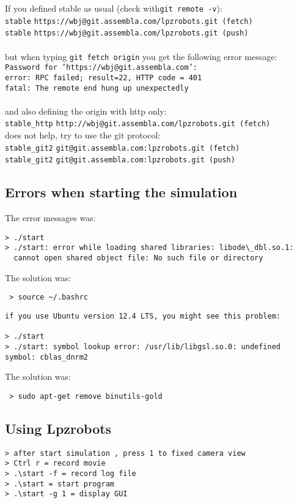 If you defined stable as usual (check with{\tt git remote -v}):\\
 \nolinkurl{stable}    \nolinkurl{https://wbj@git.assembla.com/lpzrobots.git (fetch)}\\
 \nolinkurl{stable}    \nolinkurl{https://wbj@git.assembla.com/lpzrobots.git (push)}\\\\
%
but when typing {\tt git fetch origin} you get the following error message: \\
{\tt Password for 'https://wbj@git.assembla.com':} \\
{\tt error: RPC failed; result=22, HTTP code = 401} \\
{\tt fatal: The remote end hung up unexpectedly} \\\\
%
and also defining the origin with http only:\\
\nolinkurl{stable_http}    \nolinkurl{http://wbj@git.assembla.com/lpzrobots.git (fetch)}\\
does not help, try to use the git protocol:\\
\nolinkurl{stable_git2}    \nolinkurl{git@git.assembla.com:lpzrobots.git (fetch)}\\
\nolinkurl{stable_git2}      \nolinkurl{git@git.assembla.com:lpzrobots.git (push)}










\subsection{Errors when starting the simulation}

The error messages was:

\begin{lstlisting}
> ./start
> ./start: error while loading shared libraries: libode\_dbl.so.1:
  cannot open shared object file: No such file or directory
\end{lstlisting}
The solution was:
\begin{lstlisting}
 > source ~/.bashrc
\end{lstlisting}


\begin{lstlisting}
if you use Ubuntu version 12.4 LTS, you might see this problem:

> ./start
> ./start: symbol lookup error: /usr/lib/libgsl.so.0: undefined symbol: cblas_dnrm2
\end{lstlisting}
The solution was:
\begin{lstlisting}
 > sudo apt-get remove binutils-gold
\end{lstlisting}



\subsection{Using Lpzrobots}
\begin{lstlisting}
> after start simulation , press 1 to fixed camera view
> Ctrl r = record movie
> .\start -f = record log file
> .\start = start program
> .\start -g 1 = display GUI
\end{lstlisting} 